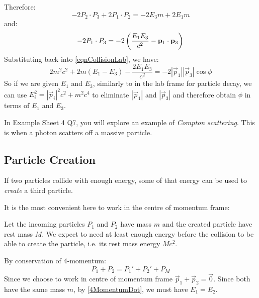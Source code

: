 \documentclass[../main.tex]{subfiles}
\begin{document}
Therefore:
\[
  -2P_2 \cdot P_3 + 2P_1 \cdot P_2 = -2E_3m + 2 E_1 m
\]
and:
\[
  -2P_1 \cdot P_3 = -2 \left(\frac{E_1E_3}{c^2} - \vec{p}_1 \cdot \vec{p}_3\right) \\
\]
Substituting back into \cref{eqnCollisionLab}, we have:
\[
  2m^2 c^2 + 2m(E_1 - E_3) - \frac{2E_1E_3}{c^2} = -2|\vec{p}_1||\vec{p}_3|\cos\phi
\]
So if we are given $E_1$ and $E_3$, similarly to in the lab frame for particle decay, we can use $E_i^2 = |\vec{p}_i|^2 c^2 + m^2 c^4$ to eliminate $|\vec{p}_1|$ and $|\vec{p}_3|$ and therefore obtain $\phi$ in terms of $E_1$ and $E_3$.
\begin{remark}
  In Example Sheet 4 Q7, you will explore an example of \textit{Compton scattering}.
  This is when a photon scatters off a massive particle.
\end{remark}
\subsection{Particle Creation}
If two particles collide with enough energy, some of that energy can be used to \textit{create} a third particle.

It is the most convenient here to work in the centre of momentum frame:
\begin{center}
\end{center}
Let the incoming particles $P_1$ and $P_2$ have mass $m$ and the created particle have rest mass $M$.
We expect to need at least enough energy before the collision to be able to create the particle, i.e. its rest mass energy $Mc^2$.

By conservation of 4-momentum:
\begin{equation}
  P_1 + P_2 = P_1' + P_2' + P_M \label{creationConserved} \tag{$\dag$}
\end{equation}
Since we choose to work in centre of momentum frame $\vec{p}_1 + \vec{p}_2 = \vec{0}$.
Since both have the same mass $m$, by \cref{4MomentumDot}, we must have $E_1 = E_2$.
\end{document}
